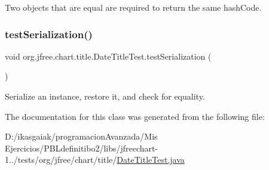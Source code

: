 Two objects that are equal are required to return the same hash\+Code. \mbox{\label{classorg_1_1jfree_1_1chart_1_1title_1_1_date_title_test_a9f101f13cca41eb201a4e9e3d17fa2b9}} 
\subsubsection{\texorpdfstring{test\+Serialization()}{testSerialization()}}
{\footnotesize\ttfamily void org.\+jfree.\+chart.\+title.\+Date\+Title\+Test.\+test\+Serialization (\begin{DoxyParamCaption}{ }\end{DoxyParamCaption})}

Serialize an instance, restore it, and check for equality. 

The documentation for this class was generated from the following file\+:\begin{DoxyCompactItemize}
\item 
D\+:/ikasgaiak/programacion\+Avanzada/\+Mis Ejercicios/\+P\+B\+Ldefinitibo2/libs/jfreechart-\/1../tests/org/jfree/chart/title/\mbox{\hyperlink{_date_title_test_8java}{Date\+Title\+Test.\+java}}\end{DoxyCompactItemize}

